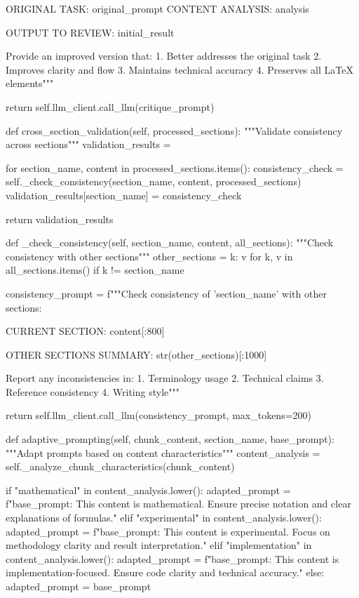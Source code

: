 ORIGINAL TASK: {original_prompt}
CONTENT ANALYSIS: {analysis}

OUTPUT TO REVIEW: {initial_result}

Provide an improved version that:
1. Better addresses the original task
2. Improves clarity and flow
3. Maintains technical accuracy
4. Preserves all LaTeX elements"""
        
        return self.llm_client.call_llm(critique_prompt)
    
    def cross_section_validation(self, processed_sections):
        """Validate consistency across sections"""
        validation_results = {}
        
        for section_name, content in processed_sections.items():
            consistency_check = self._check_consistency(section_name, content, processed_sections)
            validation_results[section_name] = consistency_check
        
        return validation_results
    
    def _check_consistency(self, section_name, content, all_sections):
        """Check consistency with other sections"""
        other_sections = {k: v for k, v in all_sections.items() if k != section_name}
        
        consistency_prompt = f"""Check consistency of '{section_name}' with other sections:

CURRENT SECTION: {content[:800]}

OTHER SECTIONS SUMMARY: {str(other_sections)[:1000]}

Report any inconsistencies in:
1. Terminology usage
2. Technical claims
3. Reference consistency
4. Writing style"""
        
        return self.llm_client.call_llm(consistency_prompt, max_tokens=200)
    
    def adaptive_prompting(self, chunk_content, section_name, base_prompt):
        """Adapt prompts based on content characteristics"""
        content_analysis = self._analyze_chunk_characteristics(chunk_content)
        
        if "mathematical" in content_analysis.lower():
            adapted_prompt = f"{base_prompt}\n\nEMPHASIS: This content is mathematical. Ensure precise notation and clear explanations of formulas."
        elif "experimental" in content_analysis.lower():
            adapted_prompt = f"{base_prompt}\n\nEMPHASIS: This content is experimental. Focus on methodology clarity and result interpretation."
        elif "implementation" in content_analysis.lower():
            adapted_prompt = f"{base_prompt}\n\nEMPHASIS: This content is implementation-focused. Ensure code clarity and technical accuracy."
        else:
            adapted_prompt = base_prompt
        
